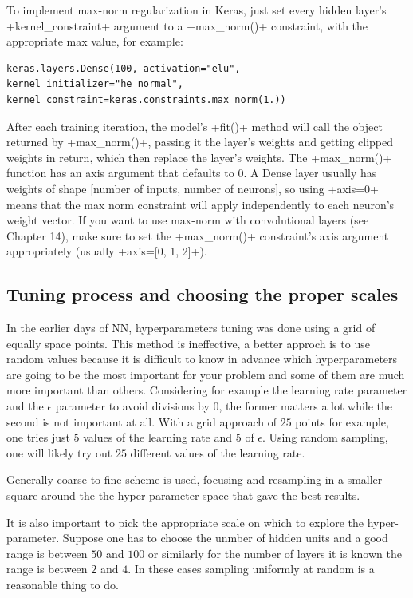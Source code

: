 To implement max-norm regularization in Keras, just set every hidden layer's \cd+kernel_constraint+ argument to a \cd+max_norm()+ constraint, with the appropriate max value, for example:
\begin{lstlisting}
keras.layers.Dense(100, activation="elu", kernel_initializer="he_normal", kernel_constraint=keras.constraints.max_norm(1.))
\end{lstlisting}
After each training iteration, the model's \cd+fit()+ method will call the object returned by \cd+max_norm()+, passing it the layer's weights and getting clipped weights in return, which then replace the layer's weights. The \cd+max_norm()+ function has an axis argument that defaults to $0$. A Dense layer usually has weights of shape [number of inputs, number of neurons], so using \cd+axis=0+ means that the max norm constraint will apply independently to each neuron's weight vector. If you want to use max-norm with convolutional layers (see Chapter 14), make sure to set the \cd+max_norm()+ constraint's axis argument appropriately (usually \cd+axis=[0, 1, 2]+).

\subsection{Tuning process and choosing the proper scales}
In the earlier days of NN, hyperparameters tuning was done using a grid of equally space points. This method is ineffective, a better approch is to use random values because it is difficult to know in advance which hyperparameters are going to be the most important for your problem and some of them are much more important than others. Considering for example the learning rate parameter and the $\epsilon$ parameter to avoid divisions by $0$, the former matters a lot while the second is not important at all. With a grid approach of $25$ points for example, one tries just $5$ values of the learning rate and $5$ of $\epsilon$. Using random sampling, one will likely try out $25$ different values of the learning rate. 

Generally coarse-to-fine scheme is used, focusing and resampling in a smaller square around the the hyper-parameter space that gave the best results.

It is also important to pick the appropriate scale on which to explore the hyper-parameter. Suppose one has to choose the unmber of hidden units and a good range is between $50$ and $100$ or similarly for the number of layers it is known the range is between $2$ and $4$. In these cases sampling uniformly at random is a reasonable thing to do. 

